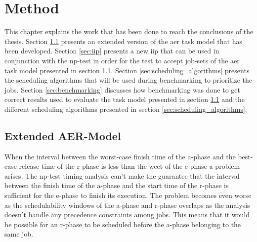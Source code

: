 \documentclass{kththesis}
\begin{document}
\chapter{Method} \label{ch:method}

This chapter explains the work that has been done to reach the conclusions of the thesis. Section
\ref{sec:work_task_model} presents an extended version of the \acrshort{aer} task model that has
been developed. Section \ref{sec:iip} presents a new \acrshort{iip} that can be used in conjunction
with the \acrshort{np}-test in order for the test to accept job-sets of the \acrshort{aer} task
model presented in section \ref{sec:work_task_model}. Section \ref{sec:scheduling_algorithms}
presents the scheduling algorithms that will be used during benchmarking to prioritize the jobs.
Section \ref{sec:benchmarking} discusses how benchmarking was done to get correct results used to
evaluate the task model presented in section \ref{sec:work_task_model} and the different scheduling
algorithms presented in section \ref{sec:scheduling_algorithms}.

\section{Extended AER-Model} \label{sec:work_task_model}

When the interval between the worst-case finish time of the \acrshort{a}-phase and the best-case
release time of the \acrshort{r}-phase is less than the \acrshort{wcet} of the \acrshort{e}-phase a
problem arises. The \acrshort{np}-test timing analysis can't make the guarantee that the interval
between the finish time of the \acrshort{a}-phase and the start time of the \acrshort{r}-phase is
sufficient for the \acrshort{e}-phase to finish its execution. The problem becomes even worse as the
schedulability windows of the \acrshort{a}-phase and \acrshort{r}-phase overlaps as the analysis
doesn't handle any precedence constraints among jobs. This means that it would be possible for an
\acrshort{r}-phase to be scheduled before the \acrshort{a}-phase belonging to the same job.
\end{document}
